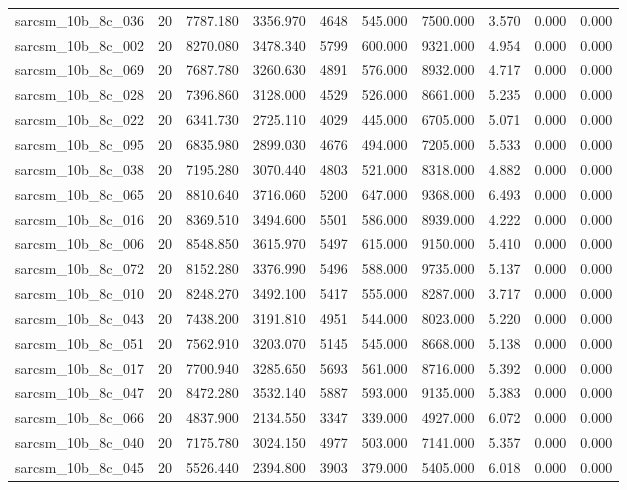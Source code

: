 \begin{tabular}{lrrrrrrrrr}
sarcsm\_10b\_8c\_036 & 20 & 7787.180 & 3356.970 & 4648 & 545.000 & 7500.000 & 3.570 & 0.000 & 0.000 \\
sarcsm\_10b\_8c\_002 & 20 & 8270.080 & 3478.340 & 5799 & 600.000 & 9321.000 & 4.954 & 0.000 & 0.000 \\
sarcsm\_10b\_8c\_069 & 20 & 7687.780 & 3260.630 & 4891 & 576.000 & 8932.000 & 4.717 & 0.000 & 0.000 \\
sarcsm\_10b\_8c\_028 & 20 & 7396.860 & 3128.000 & 4529 & 526.000 & 8661.000 & 5.235 & 0.000 & 0.000 \\
sarcsm\_10b\_8c\_022 & 20 & 6341.730 & 2725.110 & 4029 & 445.000 & 6705.000 & 5.071 & 0.000 & 0.000 \\
sarcsm\_10b\_8c\_095 & 20 & 6835.980 & 2899.030 & 4676 & 494.000 & 7205.000 & 5.533 & 0.000 & 0.000 \\
sarcsm\_10b\_8c\_038 & 20 & 7195.280 & 3070.440 & 4803 & 521.000 & 8318.000 & 4.882 & 0.000 & 0.000 \\
sarcsm\_10b\_8c\_065 & 20 & 8810.640 & 3716.060 & 5200 & 647.000 & 9368.000 & 6.493 & 0.000 & 0.000 \\
sarcsm\_10b\_8c\_016 & 20 & 8369.510 & 3494.600 & 5501 & 586.000 & 8939.000 & 4.222 & 0.000 & 0.000 \\
sarcsm\_10b\_8c\_006 & 20 & 8548.850 & 3615.970 & 5497 & 615.000 & 9150.000 & 5.410 & 0.000 & 0.000 \\
sarcsm\_10b\_8c\_072 & 20 & 8152.280 & 3376.990 & 5496 & 588.000 & 9735.000 & 5.137 & 0.000 & 0.000 \\
sarcsm\_10b\_8c\_010 & 20 & 8248.270 & 3492.100 & 5417 & 555.000 & 8287.000 & 3.717 & 0.000 & 0.000 \\
sarcsm\_10b\_8c\_043 & 20 & 7438.200 & 3191.810 & 4951 & 544.000 & 8023.000 & 5.220 & 0.000 & 0.000 \\
sarcsm\_10b\_8c\_051 & 20 & 7562.910 & 3203.070 & 5145 & 545.000 & 8668.000 & 5.138 & 0.000 & 0.000 \\
sarcsm\_10b\_8c\_017 & 20 & 7700.940 & 3285.650 & 5693 & 561.000 & 8716.000 & 5.392 & 0.000 & 0.000 \\
sarcsm\_10b\_8c\_047 & 20 & 8472.280 & 3532.140 & 5887 & 593.000 & 9135.000 & 5.383 & 0.000 & 0.000 \\
sarcsm\_10b\_8c\_066 & 20 & 4837.900 & 2134.550 & 3347 & 339.000 & 4927.000 & 6.072 & 0.000 & 0.000 \\
sarcsm\_10b\_8c\_040 & 20 & 7175.780 & 3024.150 & 4977 & 503.000 & 7141.000 & 5.357 & 0.000 & 0.000 \\
sarcsm\_10b\_8c\_045 & 20 & 5526.440 & 2394.800 & 3903 & 379.000 & 5405.000 & 6.018 & 0.000 & 0.000 \\

\end{tabular}
